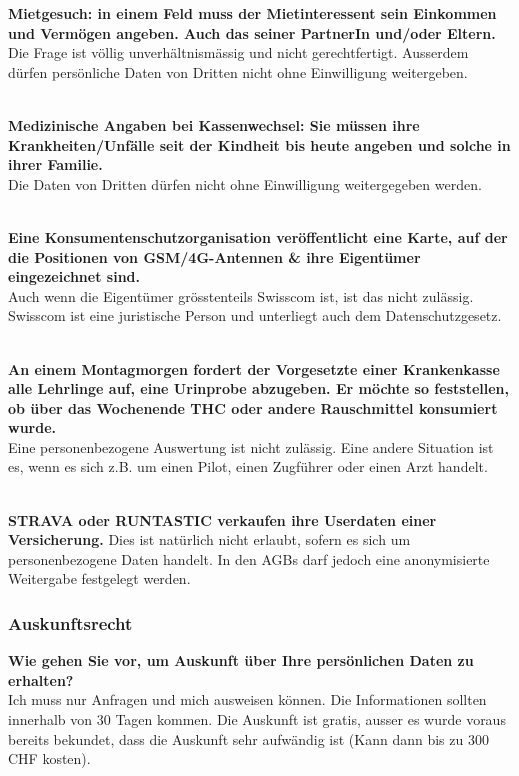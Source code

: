 \textbf{Mietgesuch: in einem Feld muss der Mietinteressent sein
Einkommen und Vermögen angeben. Auch das seiner PartnerIn und/oder
Eltern.}\\
Die Frage ist völlig unverhältnismässig und nicht gerechtfertigt.
Ausserdem dürfen persönliche Daten von Dritten nicht ohne Einwilligung
weitergeben.

\mbox{}\\
\textbf{Medizinische Angaben bei Kassenwechsel: Sie müssen ihre
Krankheiten/Unfälle seit der Kindheit bis heute angeben und solche in
ihrer Familie.}\\
Die Daten von Dritten dürfen nicht ohne Einwilligung weitergegeben
werden.

\mbox{}\\
\textbf{Eine Konsumentenschutzorganisation veröffentlicht eine Karte,
auf der die Positionen von GSM/4G-Antennen \& ihre Eigentümer
eingezeichnet sind.}\\
Auch wenn die Eigentümer grösstenteils Swisscom ist, ist das nicht
zulässig. Swisscom ist eine juristische Person und unterliegt auch dem
Datenschutzgesetz.

\mbox{}\\
\textbf{An einem Montagmorgen fordert der Vorgesetzte einer Krankenkasse
alle Lehrlinge auf, eine Urinprobe abzugeben. Er möchte so feststellen,
ob über das Wochenende THC oder andere Rauschmittel konsumiert wurde.}\\
Eine personenbezogene Auswertung ist nicht zulässig. Eine andere
Situation ist es, wenn es sich z.B. um einen Pilot, einen Zugführer oder
einen Arzt handelt.

\mbox{}\\
\textbf{STRAVA oder RUNTASTIC verkaufen ihre Userdaten einer
Versicherung.} Dies ist natürlich nicht erlaubt, sofern es sich um
personenbezogene Daten handelt. In den AGBs darf jedoch eine
anonymisierte Weitergabe festgelegt werden.

\subsubsection{Auskunftsrecht}

\textbf{Wie gehen Sie vor, um Auskunft über Ihre persönlichen Daten zu
erhalten?}\\
Ich muss nur Anfragen und mich ausweisen können. Die Informationen
sollten innerhalb von 30 Tagen kommen. Die Auskunft ist gratis, ausser
es wurde voraus bereits bekundet, dass die Auskunft sehr aufwändig ist
(Kann dann bis zu 300 CHF kosten).


